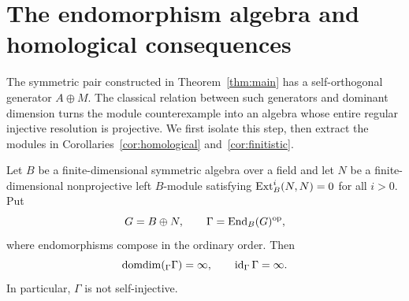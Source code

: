 \section{The endomorphism algebra and homological consequences}
\label{sec:consequences}

The symmetric pair constructed in Theorem~\ref{thm:main} has a
self-orthogonal generator $A\oplus M$. The classical relation between
such generators and dominant dimension turns the module counterexample
into an algebra whose entire regular injective resolution is projective.
We first isolate this step, then extract the modules in
Corollaries~\ref{cor:homological} and~\ref{cor:finitistic}.

\begin{proposition}\label{prop:endomorphism}
Let $B$ be a finite-dimensional symmetric algebra over a field and let
$N$ be a finite-dimensional nonprojective left $B$-module satisfying
$\operatorname{Ext}_B^i(N,N)=0$ for all $i>0$. Put
\[
 G=B\oplus N,\qquad \Gamma=\operatorname{End}_B(G)^{\mathrm{op}},
\]
where endomorphisms compose in the ordinary order. Then
\[
 \operatorname{domdim}({}_\Gamma\Gamma)=\infty,
 \qquad \operatorname{id}_\Gamma\Gamma=\infty.
\]
In particular, $\Gamma$ is not self-injective.
\end{proposition}


